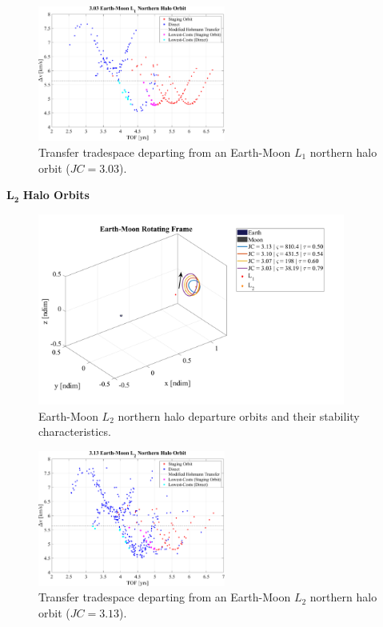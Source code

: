 \begin{figure}[ht]
    \centering
    \includegraphics[width=0.55\textwidth]{figures/TradeSpace_L1Halo_3_03.pdf}
    \caption{Transfer tradespace departing from an Earth-Moon $L_{1}$ northern halo orbit ($JC=3.03$).}
\end{figure}
\clearpage

$\pmb{L_{2}}$ \textbf{Halo Orbits}
\begin{figure}[ht]
    \centering
    \includegraphics[width=0.9\textwidth]{figures/L2HaloDepartureOrbits.pdf}
    \caption{Earth-Moon $L_{2}$ northern halo departure orbits and their stability characteristics.}
\end{figure}

\begin{figure}[ht]
    \centering
    \includegraphics[width=0.55\textwidth]{figures/TradeSpace_L2Halo_3_13.pdf}
    \caption{Transfer tradespace departing from an Earth-Moon $L_{2}$ northern halo orbit ($JC=3.13$).}
\end{figure}

